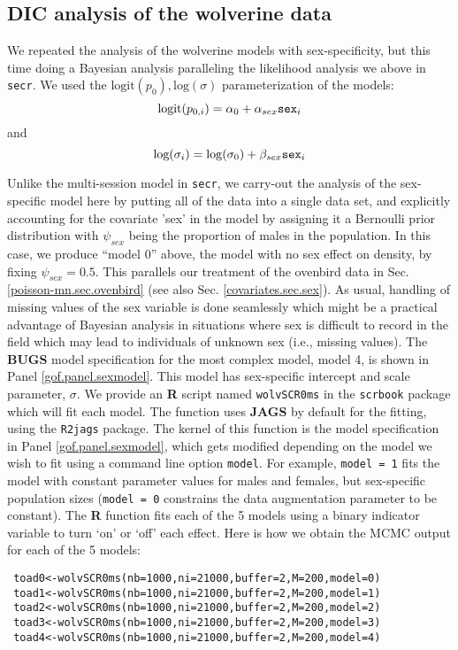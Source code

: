 \subsection{DIC analysis of the wolverine data}

We repeated the analysis of the wolverine models with sex-specificity,
but this time doing a Bayesian analysis paralleling the likelihood
analysis we above in \mbox{\tt secr}.
We used the $\mbox{logit}(p_{0}),
\mbox{log}(\sigma)$ parameterization of the models:
\[
 \mbox{logit}(p_{0,i}) = \alpha_{0} + \alpha_{sex} \mbox{\tt sex}_{i}
\]
and
\[
 \mbox{log}(\sigma_{i}) = \log(\sigma_{0}) + \beta_{sex} \mbox{\tt sex}_{i}
\]

Unlike the multi-session model in \mbox{\tt secr}, we carry-out the
analysis of the sex-specific model here by putting all of the data
into a single data set, and explicitly accounting for the covariate
'sex' in the model by assigning it a Bernoulli prior distribution with
$\psi_{sex}$ being the proportion of males in the population. In this
case, we produce ``model 0'' above, the model with no sex effect on
density, by fixing $\psi_{sex} = 0.5$. This parallels our treatment of
the ovenbird data in Sec. \ref{poisson-mn.sec.ovenbird} (see also
Sec. \ref{covariates.sec.sex}).  As usual, handling of missing values
of the sex variable is done seamlessly which might be a practical
advantage of Bayesian analysis in situations where sex is difficult to
record in the field which may lead to individuals of unknown sex
(i.e., missing values).  The {\bf BUGS} model specification for the
most complex model, model 4, is shown in Panel
\ref{gof.panel.sexmodel}.  This model has sex-specific intercept and
scale parameter, $\sigma$.  We provide an {\bf R} script named
\mbox{\tt wolvSCR0ms} in the \mbox{\tt scrbook} package which will fit
each model.  The function uses {\bf JAGS} by default for the fitting,
using the \mbox{\tt R2jags} package.  The kernel of this function is
the model specification in Panel \ref{gof.panel.sexmodel}, which gets
modified depending on the model we wish to fit using a command line
option \mbox{\tt model}. For example, \mbox{\tt model = 1} fits the
model with constant parameter values for males and females, but
sex-specific population sizes (\mbox{\tt model = 0} constrains the
data augmentation parameter to be constant).  The {\bf R} function
fits each of the 5 models using a binary indicator variable to turn
`on' or `off' each effect.  Here is how we obtain the MCMC output for
each of the 5 models: {\small
\begin{verbatim}
 toad0<-wolvSCR0ms(nb=1000,ni=21000,buffer=2,M=200,model=0)
 toad1<-wolvSCR0ms(nb=1000,ni=21000,buffer=2,M=200,model=1)
 toad2<-wolvSCR0ms(nb=1000,ni=21000,buffer=2,M=200,model=2)
 toad3<-wolvSCR0ms(nb=1000,ni=21000,buffer=2,M=200,model=3)
 toad4<-wolvSCR0ms(nb=1000,ni=21000,buffer=2,M=200,model=4)
\end{verbatim}
}



